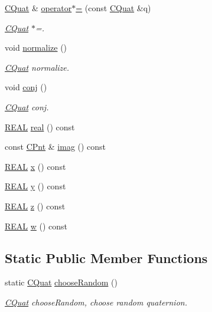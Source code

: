 \begin{DoxyCompactItemize}
\hyperlink{classCQuat}{C\-Quat} \& \hyperlink{classCQuat_a91a9f75dd706a025a68121522d30a561}{operator$\ast$=} (const \hyperlink{classCQuat}{C\-Quat} \&q)
\begin{DoxyCompactList}\small\item\em \hyperlink{classCQuat}{C\-Quat} $\ast$=. \end{DoxyCompactList}\item 
void \hyperlink{classCQuat_ab6e67daab741dfb157e3e5562a804706}{normalize} ()
\begin{DoxyCompactList}\small\item\em \hyperlink{classCQuat}{C\-Quat} normalize. \end{DoxyCompactList}\item 
void \hyperlink{classCQuat_a03c7815f439647be9e4cc8f3937cd0d0}{conj} ()
\begin{DoxyCompactList}\small\item\em \hyperlink{classCQuat}{C\-Quat} conj. \end{DoxyCompactList}\item 
\hyperlink{util_8h_a5821460e95a0800cf9f24c38915cbbde}{R\-E\-A\-L} \hyperlink{classCQuat_a7f18efa604d788a39bb6726de6546ce2}{real} () const 
\item 
const \hyperlink{classCPnt}{C\-Pnt} \& \hyperlink{classCQuat_a783b34fbc307fbb00fd112c8441b0f30}{imag} () const 
\item 
\hyperlink{util_8h_a5821460e95a0800cf9f24c38915cbbde}{R\-E\-A\-L} \hyperlink{classCQuat_ae6b5a06a27a9253ec3737101ddd02ee5}{x} () const 
\item 
\hyperlink{util_8h_a5821460e95a0800cf9f24c38915cbbde}{R\-E\-A\-L} \hyperlink{classCQuat_a01fcb600b793533c9f7554668739ac86}{y} () const 
\item 
\hyperlink{util_8h_a5821460e95a0800cf9f24c38915cbbde}{R\-E\-A\-L} \hyperlink{classCQuat_a1d2b9113413336187282a0dffcf5b39b}{z} () const 
\item 
\hyperlink{util_8h_a5821460e95a0800cf9f24c38915cbbde}{R\-E\-A\-L} \hyperlink{classCQuat_a8e83cf929e0e4f669482b419b20a096c}{w} () const 
\end{DoxyCompactItemize}
\subsection*{Static Public Member Functions}
\begin{DoxyCompactItemize}
\item 
static \hyperlink{classCQuat}{C\-Quat} \hyperlink{classCQuat_a3788f9ce393c8c6e7dc2df6e7675c594}{choose\-Random} ()
\begin{DoxyCompactList}\small\item\em \hyperlink{classCQuat}{C\-Quat} choose\-Random, choose random quaternion. \end{DoxyCompactList}\end{DoxyCompactItemize}

